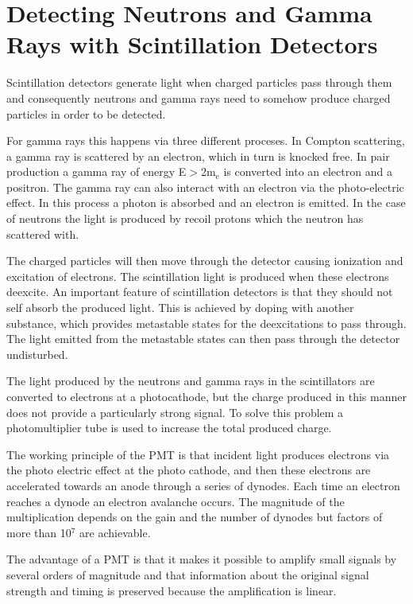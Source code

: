 \documentclass[main.tex]{subfiles}
\begin{document}
\section{Detecting Neutrons and Gamma Rays with Scintillation Detectors}
Scintillation detectors generate light when charged particles pass through them and consequently neutrons and gamma rays need to somehow produce charged particles in order to be detected.

For gamma rays this happens via three different proceses. In Compton scattering, a gamma ray is scattered by an electron, which in turn is knocked free. In pair production a gamma ray of energy E$>$2m$_\text{e}$ is converted into an electron and a positron. The gamma ray can also interact with an electron via the photo-electric effect. In this process a photon is absorbed and an electron is emitted. In the case of neutrons the light is produced by recoil protons which the neutron has scattered with.

The charged particles will then move through the detector causing ionization and excitation of electrons. The scintillation light is produced when these electrons deexcite. An important feature of scintillation detectors is that they should not self absorb the produced light. This is achieved by doping with another substance, which provides metastable states for the deexcitations to pass through. The light emitted from the metastable states can then pass through the detector undisturbed.

The light produced by the neutrons and gamma rays in the scintillators are converted to electrons at a photocathode, but the charge produced in this manner does not provide a particularly strong signal. To solve this problem a photomultiplier tube is used to increase the total produced charge. 

The working principle of the PMT is that incident light produces electrons via the photo electric effect at the photo cathode, and then these electrons are accelerated towards an anode through a series of dynodes. Each time an electron reaches a dynode an electron avalanche occurs. The magnitude of the multiplication depends on the gain and the number of dynodes but factors of more than 10$^\text{7}$ are achievable. 

The advantage of a PMT is that it makes it possible to amplify small signals by several orders of magnitude and that information about the original signal strength and timing is preserved because the amplification is linear.
\end{document}
